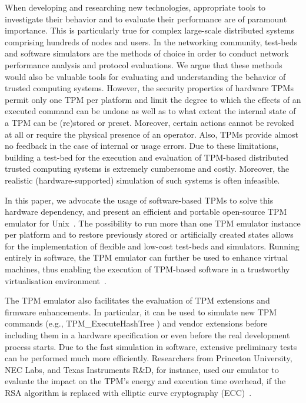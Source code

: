 \documentclass[runningheads]{llncs}
\begin{document}
When developing and researching new technologies, appropriate tools to
investigate their behavior and to evaluate their performance are of paramount
importance. This is particularly true for complex large-scale distributed
systems comprising hundreds of nodes and users.
In the networking community, test-beds and software simulators are the methods
of choice in order to conduct network performance analysis and protocol
evaluations. We argue that these methods would also be valuable tools for
evaluating and understanding the behavior of trusted
computing systems. However, the security properties of hardware TPMs permit
only one TPM per platform and limit the degree to which the effects of an
executed command can be undone as well as to what extent the internal state
of a TPM can be (re)stored or preset. Moreover, certain actions cannot be
revoked at all or require the physical presence of an operator. Also, TPMs
provide almost no feedback in the case of internal or usage errors. Due to
these limitations, building a test-bed for the execution and evaluation of
TPM-based distributed trusted computing systems is extremely cumbersome and
costly. Moreover, the realistic (hardware-supported) simulation of such
systems is often infeasible.

In this paper, we advocate the usage of software-based TPMs to solve this
hardware dependency, and present an efficient and portable open-source TPM
emulator for Unix~\cite{TPMEmu}. The possibility to run more than one TPM
emulator instance per platform and to restore previously stored or
artificially created states allows for the implementation of flexible and
low-cost test-beds and simulators. Running entirely in software,
the TPM emulator can further be used to enhance virtual machines, thus
enabling the execution of TPM-based software in a trustworthy virtualisation
environment~\cite{Xen}.

The TPM emulator also facilitates the evaluation of TPM extensions and
firmware enhancements. In particular, it can be used to simulate new TPM
commands (e.g., \textsf{TPM\_ExecuteHashTree} \cite{Sarmenta})
and vendor extensions before including them in a hardware specification
or even before the real development process starts. Due to the fast
simulation in software, extensive preliminary tests can be performed much
more efficiently.
Researchers from Princeton University, NEC Labs, and Texas Instruments R\&D,
for instance, used our emulator to evaluate the impact on the TPM's energy
and execution time overhead, if the RSA algorithm is replaced with elliptic
curve cryptography (ECC)~\cite{Aaraj}.
\end{document}
